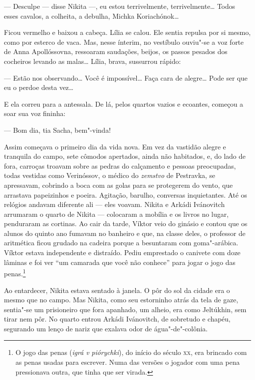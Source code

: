 --- Desculpe --- disse Nikita ---, eu estou terrivelmente,
terrivelmente\ldots{} Todos esses cavalos, a colheita, a debulha, Michka
Koriachónok\ldots{}

Ficou vermelho e baixou a cabeça. Lília se calou. Ele sentia repulsa por
si mesmo, como por esterco de vaca. Mas, nesse ínterim, no vestíbulo
ouviu"-se a voz forte de Anna Apollóssovna, ressoaram saudações, beijos,
os passos pesados dos cocheiros levando as malas\ldots{} Lília, brava,
sussurrou rápido:

--- Estão nos observando\ldots{} Você é impossível\ldots{} Faça cara de alegre\ldots{}
Pode ser que eu o perdoe desta vez\ldots{}

E ela correu para a antessala. De lá, pelos quartos vazios e ecoantes,
começou a soar sua voz fininha:

--- Bom dia, tia Sacha, bem"-vinda!

Assim começava o primeiro dia da vida nova. Em vez da vastidão alegre e
tranquila do campo, sete cômodos apertados, ainda não habitados, e, do
lado de fora, carroças troavam sobre as pedras do calçamento e pessoas
preocupadas, todas vestidas como Verinóssov, o médico do \emph{zemstvo}
de Pestravka, se apressavam, cobrindo a boca com as golas para se
protegerem do vento, que arrastava papeizinhos e poeira. Agitação,
barulho, conversas inquietantes. Até os relógios andavam diferente ali
--- eles voavam. Nikita e Arkádi Ivánovitch arrumaram o quarto de Nikita
--- colocaram a mobília e os livros no lugar, penduraram as cortinas. Ao
cair da tarde, Víktor veio do ginásio e contou que os alunos do quinto
ano fumavam no banheiro e que, na classe deles, o professor de
aritmética ficou grudado na cadeira porque a besuntaram com
goma"-arábica. Víktor estava independente e distraído. Pediu
emprestado o canivete com doze lâminas e foi ver ``um camarada que você
não conhece'' para jogar o jogo das penas.\footnote{O jogo das penas
  (\emph{igrá v piórychki}), do início do século \textsc{xx}, era brincado com as
  penas usadas para escrever. Numa das versões o jogador com uma pena
  pressionava outra, que tinha que ser virada.}

Ao entardecer, Nikita estava sentado à janela. O pôr do sol da cidade
era o mesmo que no campo. Mas Nikita, como seu estorninho atrás da tela
de gaze, sentia"-se um prisioneiro que fora apanhado, um alheio, era como
Jeltúkhin, sem tirar nem pôr. No quarto entrou Arkádi Ivánovitch, de
sobretudo e chapéu, segurando um lenço de nariz que exalava odor de
água"-de"-colônia.

